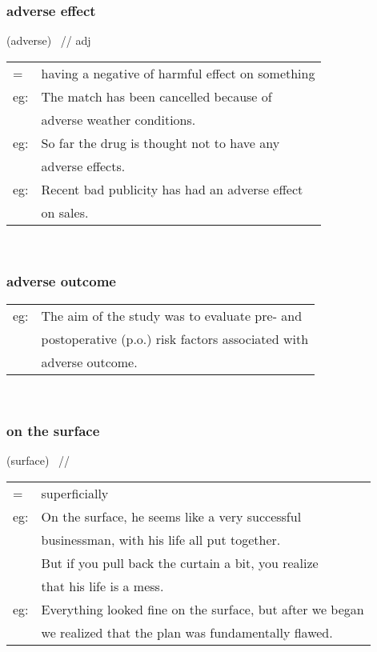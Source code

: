 \documentclass[14pt, t]{beamer}
\begin{document}
\begin{frame}
\frametitle{adverse effect}
(adverse) \, // \quad adj \\[8pt]
\begin{tabular}{ll}
= & having a negative of harmful effect on something \\[8pt]
eg: & The match has been cancelled because of \\
& adverse weather conditions. \\[8pt]
eg: & So far the drug is thought not to have any \\
& adverse effects. \\[8pt]
eg: & Recent bad publicity has had an adverse effect \\
& on sales. \\
\end{tabular} \\
\end{frame}
\begin{frame}
\frametitle{adverse outcome}
\begin{tabular}{ll}
eg: & The aim of the study was to evaluate pre- and \\[1pt]
& postoperative (p.o.) risk factors associated with \\[1pt]
& adverse outcome. \\
\end{tabular} \\
\end{frame}
\begin{frame}
\frametitle{on the surface}
(surface) \, // \\[8pt]
\begin{tabular}{ll}
= & superficially \\[1pt]
eg: & On the surface, he seems like a very successful \\
& businessman, with his life all put together. \\
& But if you pull back the curtain a bit, you realize \\
& that his life is a mess. \\
%
eg: & Everything looked fine on the surface, but after we began \\
& we realized that the plan was fundamentally flawed. \\
\end{tabular} \\
\end{frame}
\end{document}
